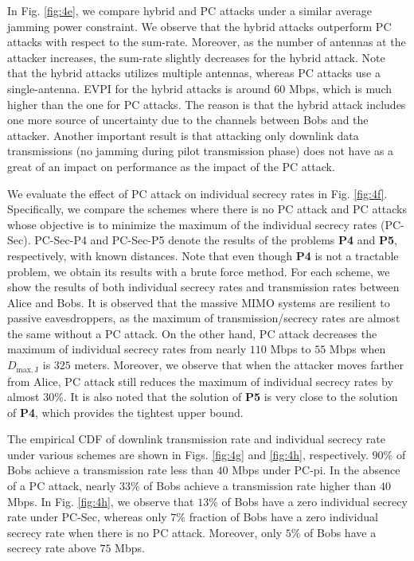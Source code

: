 \documentclass[draftclsnofoot, 12pt, onecolumn, journal]{IEEEtran}
\begin{document}
In Fig. \ref{fig:4e}, we compare hybrid and PC attacks under a similar average jamming power constraint.
We observe that the hybrid attacks outperform PC attacks with respect to the sum-rate.
Moreover, as the number of antennas at the attacker increases, the sum-rate slightly decreases for the hybrid attack.
Note that the hybrid attacks utilizes multiple antennas, whereas PC attacks use a single-antenna.
EVPI for the hybrid attacks is around $60$ Mbps, which is much higher than the one for PC attacks.
The reason is that the hybrid attack includes one more source of uncertainty due to the channels between Bobs and the attacker.
Another important result is that attacking only downlink data transmissions (no jamming during pilot transmission phase) does not have as a great of an impact on performance as the impact of the PC attack.

We evaluate the effect of PC attack on individual secrecy rates in Fig. \ref{fig:4f}.
Specifically, we compare the schemes where there is no PC attack and PC attacks whose objective is to minimize the maximum of the individual secrecy rates (PC-Sec).
PC-Sec-P4 and PC-Sec-P5 denote the results of the problems \textbf{P4} and \textbf{P5}, respectively, with known distances.
Note that even though \textbf{P4} is not a tractable problem, we obtain its results with a brute force method.
For each scheme, we show the results of both individual secrecy rates and transmission rates between Alice and Bobs.
It is observed that the massive MIMO systems are resilient to passive eavesdroppers, as the maximum of transmission/secrecy rates are almost the same without a PC attack.
On the other hand, PC attack decreases the maximum of individual secrecy rates from nearly $110$ Mbps to $55$ Mbps when $D_{\mathrm{max,J}}$ is $325$ meters.
Moreover, we observe that when the attacker moves farther from Alice, PC attack still reduces the maximum of individual secrecy rates by almost $30\%$.
It is also noted that the solution of \textbf{P5} is very close to the solution of \textbf{P4}, which provides the tightest upper bound. 

The empirical CDF of downlink transmission rate and individual secrecy rate under various schemes are shown in Figs. \ref{fig:4g} and \ref{fig:4h}, respectively.
$90\%$ of Bobs achieve a transmission rate less than $40$ Mbps under PC-pi.
In the absence of a PC attack, nearly $33\%$ of Bobs achieve a transmission rate higher than $40$ Mbps.
In Fig. \ref{fig:4h}, we observe that $13\%$ of Bobs have a zero individual secrecy rate under PC-Sec, whereas only $7\%$ fraction of Bobs have a zero individual secrecy rate when there is no PC attack.
Moreover, only $5\%$ of Bobs have a secrecy rate above $75$ Mbps.  
\end{document}
